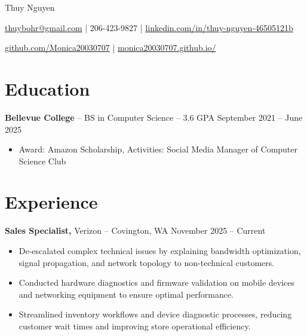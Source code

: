 \documentclass[11pt]{article}       %
\begin{document}
\centerline{\Huge Thuy Nguyen}

\vspace{5pt}

\centerline{\href{mailto:thuybohr@gmail.com}{thuybohr@gmail.com} | 206-423-9827 |
\href{https://www.linkedin.com/in/thuy-nguyen-46505121b/}{linkedin.com/in/thuy-nguyen-46505121b}}

\centerline{\href{https://github.com/Monica20030707}{github.com/Monica20030707} | 
\href{https://monica20030707.github.io/}{monica20030707.github.io/}} 

\vspace{-9pt}

\section*{Education}
\textbf{Bellevue College} -- BS in Computer Science -- 3.6 GPA \hfill September 2021 -- June 2025\\
\vspace{-9pt}
\begin{itemize}
  \item Award: Amazon Scholarship, Activities: Social Media Manager of Computer Science Club
\end{itemize}

\vspace{-18.5pt}

\section*{Experience}

\textbf{Sales Specialist,} {Verizon} -- Covington, WA \hfill November 2025 -- Current \\
\vspace{-9pt}
\begin{itemize}
  \item De-escalated complex technical issues by explaining bandwidth optimization, signal propagation, and network topology to non-technical customers.
  \item Conducted hardware diagnostics and firmware validation on mobile devices and networking equipment to ensure optimal performance.
  \item Streamlined inventory workflows and device diagnostic processes, reducing customer wait times and improving store operational efficiency.
\end{itemize}
\end{document}

